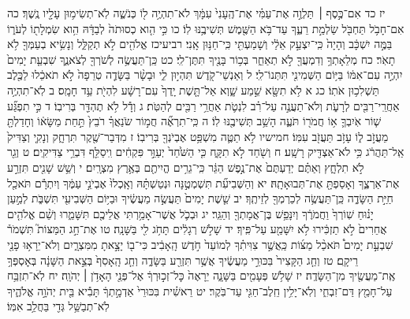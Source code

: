 \documentclass[twoside, openany, parskip=half, 11pt]{book}
\begin{document}
יז כד אִם־כֶּ֣סֶף ׀ תַּלְוֶ֣ה אֶת־עַמִּ֗י אֶת־הֶֽעָנִי֙ עִמָּ֔ךְ לֹא־תִהְיֶ֥ה ל֖וֹ כְּנֹשֶׁ֑ה לֹֽא־תְשִׂימ֥וּן עָלָ֖יו נֶֽשֶׁךְ׃ כה אִם־חָבֹ֥ל תַּחְבֹּ֖ל שַׂלְמַ֣ת רֵעֶ֑ךָ עַד־בֹּ֥א הַשֶּׁ֖מֶשׁ תְּשִׁיבֶ֥נּוּ לֽוֹ׃ כו כִּ֣י הִ֤וא כְסוּתֹה֙ לְבַדָּ֔הּ הִ֥וא שִׂמְלָת֖וֹ לְעֹר֑וֹ בַּמֶּ֣ה יִשְׁכָּ֔ב וְהָיָה֙ כִּֽי־יִצְעַ֣ק אֵלַ֔י וְשָׁמַעְתִּ֖י כִּֽי־חַנּ֥וּן אָֽנִי׃
רביעיכז אֱלֹהִ֖ים לֹ֣א תְקַלֵּ֑ל וְנָשִׂ֥יא בְעַמְּךָ֖ לֹ֥א תָאֹֽר׃ כח מְלֵאָתְךָ֥ וְדִמְעֲךָ֖ לֹ֣א תְאַחֵ֑ר בְּכ֥וֹר בָּנֶ֖יךָ תִּתֶּן־לִֽי׃ כט כֵּֽן־תַּעֲשֶׂ֥ה לְשֹׁרְךָ֖ לְצֹאנֶ֑ךָ שִׁבְעַ֤ת יָמִים֙ יִהְיֶ֣ה עִם־אִמּ֔וֹ בַּיּ֥וֹם הַשְּׁמִינִ֖י תִּתְּנוֹ־לִֽי׃ ל וְאַנְשֵׁי־קֹ֖דֶשׁ תִּהְי֣וּן לִ֑י וּבָשָׂ֨ר בַּשָּׂדֶ֤ה טְרֵפָה֙ לֹ֣א תֹאכֵ֔לוּ לַכֶּ֖לֶב תַּשְׁלִכ֥וּן אֹתֽוֹ׃
כג א לֹ֥א תִשָּׂ֖א שֵׁ֣מַע שָׁ֑וְא אַל־תָּ֤שֶׁת יָֽדְךָ֙ עִם־רָשָׁ֔ע לִהְיֹ֖ת עֵ֥ד חָמָֽס׃ ב לֹֽא־תִהְיֶ֥ה אַחֲרֵֽי־רַבִּ֖ים לְרָעֹ֑ת וְלֹא־תַעֲנֶ֣ה עַל־רִ֗ב לִנְטֹ֛ת אַחֲרֵ֥י רַבִּ֖ים לְהַטֹּֽת׃ ג וְדָ֕ל לֹ֥א תֶהְדַּ֖ר בְּרִיבֽוֹ׃
ד כִּ֣י תִפְגַּ֞ע שׁ֧וֹר אֹֽיִבְךָ֛ א֥וֹ חֲמֹר֖וֹ תֹּעֶ֑ה הָשֵׁ֥ב תְּשִׁיבֶ֖נּוּ לֽוֹ׃
ה כִּֽי־תִרְאֶ֞ה חֲמ֣וֹר שֹׂנַאֲךָ֗ רֹבֵץ֙ תַּ֣חַת מַשָּׂא֔וֹ וְחָדַלְתָּ֖ מֵעֲזֹ֣ב ל֑וֹ עָזֹ֥ב תַּעֲזֹ֖ב עִמּֽוֹ׃
חמישיו לֹ֥א תַטֶּ֛ה מִשְׁפַּ֥ט אֶבְיֹנְךָ֖ בְּרִיבֽוֹ׃ ז מִדְּבַר־שֶׁ֖קֶר תִּרְחָ֑ק וְנָקִ֤י וְצַדִּיק֙ אַֽל־תַּהֲרֹ֔ג כִּ֥י לֹא־אַצְדִּ֖יק רָשָֽׁע׃ ח וְשֹׁ֖חַד לֹ֣א תִקָּ֑ח כִּ֤י הַשֹּׁ֙חַד֙ יְעַוֵּ֣ר פִּקְחִ֔ים וִֽיסַלֵּ֖ף דִּבְרֵ֥י צַדִּיקִֽים׃ ט וְגֵ֖ר לֹ֣א תִלְחָ֑ץ וְאַתֶּ֗ם יְדַעְתֶּם֙ אֶת־נֶ֣פֶשׁ הַגֵּ֔ר כִּֽי־גֵרִ֥ים הֱיִיתֶ֖ם בְּאֶ֥רֶץ מִצְרָֽיִם׃ י וְשֵׁ֥שׁ שָׁנִ֖ים תִּזְרַ֣ע אֶת־אַרְצֶ֑ךָ וְאָסַפְתָּ֖ אֶת־תְּבוּאָתָֽהּ׃ יא וְהַשְּׁבִיעִ֞ת תִּשְׁמְטֶ֣נָּה וּנְטַשְׁתָּ֗הּ וְאָֽכְלוּ֙ אֶבְיֹנֵ֣י עַמֶּ֔ךָ וְיִתְרָ֕ם תֹּאכַ֖ל חַיַּ֣ת הַשָּׂדֶ֑ה כֵּֽן־תַּעֲשֶׂ֥ה לְכַרְמְךָ֖ לְזֵיתֶֽךָ׃ יב שֵׁ֤שֶׁת יָמִים֙ תַּעֲשֶׂ֣ה מַעֲשֶׂ֔יךָ וּבַיּ֥וֹם הַשְּׁבִיעִ֖י תִּשְׁבֹּ֑ת לְמַ֣עַן יָנ֗וּחַ שֽׁוֹרְךָ֙ וַחֲמֹרֶ֔ךָ וְיִנָּפֵ֥שׁ בֶּן־אֲמָתְךָ֖ וְהַגֵּֽר׃ יג וּבְכֹ֛ל אֲשֶׁר־אָמַ֥רְתִּי אֲלֵיכֶ֖ם תִּשָּׁמֵ֑רוּ וְשֵׁ֨ם אֱלֹהִ֤ים אֲחֵרִים֙ לֹ֣א תַזְכִּ֔ירוּ לֹ֥א יִשָּׁמַ֖ע עַל־פִּֽיךָ׃ יד שָׁלֹ֣שׁ רְגָלִ֔ים תָּחֹ֥ג לִ֖י בַּשָּׁנָֽה׃ טו אֶת־חַ֣ג הַמַּצּוֹת֮ תִּשְׁמֹר֒ שִׁבְעַ֣ת יָמִים֩ תֹּאכַ֨ל מַצּ֜וֹת כַּֽאֲשֶׁ֣ר צִוִּיתִ֗ךָ לְמוֹעֵד֙ חֹ֣דֶשׁ הָֽאָבִ֔יב כִּי־ב֖וֹ יָצָ֣אתָ מִמִּצְרָ֑יִם וְלֹא־יֵרָא֥וּ פָנַ֖י רֵיקָֽם׃ טז וְחַ֤ג הַקָּצִיר֙ בִּכּוּרֵ֣י מַעֲשֶׂ֔יךָ אֲשֶׁ֥ר תִּזְרַ֖ע בַּשָּׂדֶ֑ה וְחַ֤ג הָֽאָסִף֙ בְּצֵ֣את הַשָּׁנָ֔ה בְּאׇסְפְּךָ֥ אֶֽת־מַעֲשֶׂ֖יךָ מִן־הַשָּׂדֶֽה׃ יז שָׁלֹ֥שׁ פְּעָמִ֖ים בַּשָּׁנָ֑ה יֵרָאֶה֙ כׇּל־זְכ֣וּרְךָ֔ אֶל־פְּנֵ֖י הָאָדֹ֥ן ׀ יְהֹוָֽה׃ יח לֹֽא־תִזְבַּ֥ח עַל־חָמֵ֖ץ דַּם־זִבְחִ֑י וְלֹֽא־יָלִ֥ין חֵֽלֶב־חַגִּ֖י עַד־בֹּֽקֶר׃ יט רֵאשִׁ֗ית בִּכּוּרֵי֙ אַדְמָ֣תְךָ֔ תָּבִ֕יא בֵּ֖ית יְהֹוָ֣ה אֱלֹהֶ֑יךָ לֹֽא־תְבַשֵּׁ֥ל גְּדִ֖י בַּחֲלֵ֥ב אִמּֽוֹ׃
\end{document}
